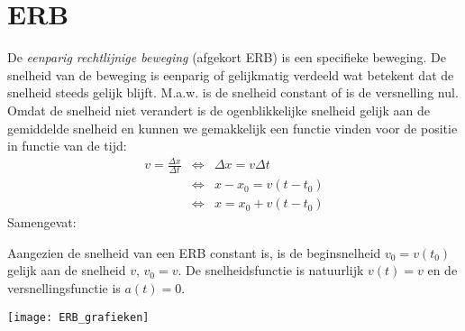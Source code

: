 \documentclass{ximera}
\begin{document}
	\author{Bart Lambregs}
    \xmsource



	\section{ERB}

	De \emph{eenparig rechtlijnige beweging} (afgekort ERB) is een specifieke beweging. De snelheid van de beweging is eenparig of gelijkmatig verdeeld wat betekent dat de snelheid steeds gelijk blijft. M.a.w. is de snelheid constant of is de versnelling nul. Omdat de snelheid niet verandert is de ogenblikkelijke snelheid gelijk aan de gemiddelde snelheid en kunnen we gemakkelijk een functie vinden voor de positie in functie van de tijd:
	\begin{eqnarray*}
	v=\frac{\Delta x}{\Delta t}&\Leftrightarrow&\Delta x=v\Delta t\\
	&\Leftrightarrow&x-x_0=v(t-t_0)\\
	&\Leftrightarrow&x=x_0+v(t-t_0)
	\end{eqnarray*}
	Samengevat:
	
	
	Aangezien de snelheid van een ERB constant is, is de beginsnelheid $v_0=v(t_0)$ gelijk aan de snelheid $v$, $v_0=v$. De snelheidsfunctie is natuurlijk $v(t)=v$ en de versnellingsfunctie is $a(t)=0$.
	\begin{image}
	
	\texttt{[image: ERB\_grafieken]}
	\end{image}
	
	
	
\end{document}

